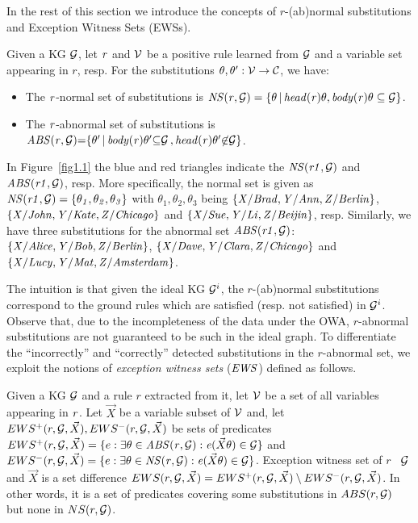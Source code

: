 In the rest of this section we introduce the concepts of $r$-(ab)normal substitutions and Exception Witness Sets (EWSs).

\begin{definition}\label{sec:rulelearn}
Given a KG $\mathcal{G}$, let $\mathit{r}$ and $\mathcal{V}$ be a positive rule learned from $\mathcal{G}$ and a variable set appearing in $r$, resp. For the substitutions $\theta,\theta':\mathcal{V} \rightarrow \mathcal{C}$, we have:

\begin{itemize}
\item The $\mathit{r}$-normal set of substitutions is $\mathit{NS(r, \mathcal{G})=\{\theta\, |\, head(r)\theta,body(r)\theta \subseteq \mathcal{G}\}}$.
\item The $\mathit{r}$-abnormal set of substitutions is $\mathit{ABS(r, \mathcal{G}){=}\{\theta'\, |\, body(r)\theta'} \mathit{{\subseteq} \mathcal{G}\,{,}\,head(r)\theta' {\not \in} \mathcal{G}\}}$.
\end{itemize}
\end{definition}

\begin{example}\label{ex:abns}
In Figure~\ref{fig1.1} the blue and red triangles indicate the $\mathit{NS(r1,\mathcal{G})}$ and $\mathit{ABS(r1,\mathcal{G})}$, resp. More specifically, the normal set is given as $\mathit{NS(r1,\mathcal{G})}=\{\mathit{\theta_1,\theta_2,\theta_3}\}$ with $\theta_1,\theta_2,\theta_3$ being $\{\mathit{X/Brad,Y/Ann,Z/Berlin}\}$, $\{\mathit{X/John,Y/Kate,Z/Chicago}\}$ and $\{\mathit{X/Sue,Y/Li,Z/Beijin}\}$, resp. Similarly, we have three substitutions for the abnormal set $\mathit{ABS(r1,\mathcal{G})}$: $\{\mathit{X/Alice,Y/Bob,Z/Berlin}\}$, $\{\mathit{X/Dave,Y/Clara,Z/Chicago}\}$ and $\{\mathit{X/Lucy,Y/Mat,Z/Amsterdam}\}$.
\end{example}

The intuition is that given the ideal KG $\mathcal{G}^i$, the $r$-(ab)normal substitutions correspond to the ground rules which are satisfied (resp. not satisfied) in $\mathcal{G}^i$. Observe that, due to the incompleteness of the data under the OWA, $r$-abnormal substitutions are not guaranteed to be such in the ideal graph. To differentiate the ``incorrectly'' and ``correctly'' detected substitutions in the $r$-abnormal set, we exploit the notions of \emph{exception witness sets} ($\mathit{EWS}$) defined as follows.

\begin{definition} \label{def:ews}
Given a KG $\mathcal{G}$ and a rule $r$ extracted from it, let $\mathcal{V}$ be a set of all variables appearing in $\mathit{r}$. Let $\vec{X}$ be a variable subset of $\mathcal{V}$ and, let $EWS^+(r,\mathcal{G},\vec{X}), EWS^-(r,\mathcal{G},\vec{X})$ be sets of predicates $EWS^+(r,\mathcal{G},\vec{X})=\{e: \exists \theta \in \mathit{ABS(r,\mathcal{G})}: \mathit{e}(\vec{X}\theta)\in \mathcal{G}\}$ and $EWS^-(r,\mathcal{G},\vec{X})=\{e: \exists \theta \in \mathit{NS(r,\mathcal{G})}: \mathit{e}(\vec{X}\theta)\in \mathcal{G}\}$. Exception witness set of $r$ \wrt\ $\mathcal{G}$ and $\vec{X}$ is a set difference $EWS(r,\mathcal{G},\vec{X})=EWS^+(r,\mathcal{G},\vec{X}) \setminus EWS^-(r,\mathcal{G},\vec{X})$. In other words, it is a set of predicates covering some substitutions in $ABS(r, \mathcal{G})$ but none in $NS(r, \mathcal{G})$.
\end{definition}

